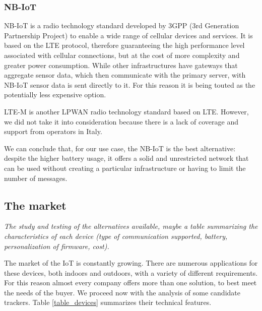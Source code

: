 \subsubsection{NB-IoT}
NB-IoT is a radio technology standard developed by 3GPP (3rd Generation Partnership Project) to enable a wide range of cellular devices and services. It is based on the LTE protocol, therefore guaranteeing the high performance level associated with cellular connections, but at the cost of more complexity and greater power consumption. While other infrastructures have gateways that aggregate sensor data, which then communicate with the primary server, with NB-IoT sensor data is sent directly to it. For this reason it is being touted as the potentially less expensive option.

LTE-M is another LPWAN radio technology standard based on LTE. However, we did not take it into consideration because there is a lack of coverage and support from operators in Italy.

We can conclude that, for our use case, the NB-IoT is the best alternative: despite the higher battery usage, it offers a solid and unrestricted network that can be used without creating a particular infrastructure or having to limit the number of messages.


\subsection{The market}
\textit{The study and testing of the alternatives available, maybe a table summarizing the characteristics of each device (type of communication supported, battery, personalization of firmware, cost).}

The market of the IoT is constantly growing. There are numerous applications for these devices, both indoors and outdoors, with a variety of different requirements. For this reason almost every company offers more than one solution, to best meet the needs of the buyer. We proceed now with the analysis of some candidate trackers. Table \ref{table_devices} summarizes their technical features.

